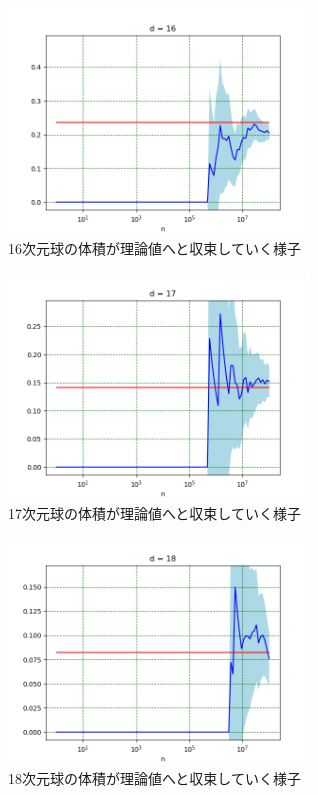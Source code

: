 \documentclass[a4paper,twoside]{jarticle}
\begin{document}
\begin{figure}[H]
\begin{center}
\includegraphics[width=8cm]{../python/report1_monte_carlo/out/r2plot16d.png}
\end{center}
\caption{16次元球の体積が理論値へと収束していく様子}
\end{figure}

\begin{figure}[H]
\begin{center}
\includegraphics[width=8cm]{../python/report1_monte_carlo/out/r2plot17d.png}
\end{center}
\caption{17次元球の体積が理論値へと収束していく様子}
\end{figure}

\begin{figure}[H]
\begin{center}
\includegraphics[width=8cm]{../python/report1_monte_carlo/out/r2plot18d.png}
\end{center}
\caption{18次元球の体積が理論値へと収束していく様子}
\end{figure}
\end{document}
